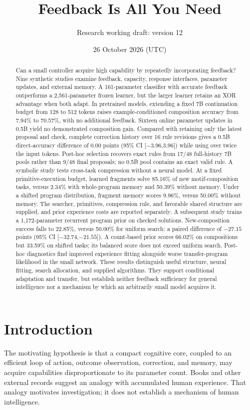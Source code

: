 \documentclass[11pt]{article}
\title{Feedback Is All You Need}
\author{Research working draft: version 12}
\date{26 October 2026 (UTC)}
\begin{document}
\maketitle
\begin{abstract}
Can a small controller acquire high capability by repeatedly incorporating
feedback? Nine synthetic studies examine feedback, capacity, response
interfaces, parameter updates, and external memory. A 161-parameter classifier
with accurate feedback outperforms a 2,561-parameter frozen learner, but the
larger learner retains an XOR advantage when both adapt. In pretrained models,
extending a fixed 7B continuation budget from 128 to 512 tokens raises
example-conditioned composition accuracy from 7.94\% to 70.57\%, with no
additional feedback. Sixteen online parameter updates in 0.5B yield no
demonstrated composition gain. Compared with retaining only the latest proposal
and check, complete correction history over 16 rule revisions gives a 0.5B
direct-accuracy difference of 0.00 points
(95\% CI [$-3.96$,3.96]) while using over twice the input tokens.
Post-hoc selection recovers exact rules from 17/48 full-history 7B pools
rather than 9/48 final proposals; no 0.5B pool contains an exact valid rule.
A symbolic study tests cross-task compression without a neural model.
At a fixed primitive-execution budget, learned fragments solve 85.16\% of
new motif-composition tasks, versus 2.34\% with whole-program memory and
50.39\% without memory. Under a shifted program distribution, fragment
memory scores 9.96\%, versus 50.00\% without memory. The searcher, primitives,
compression rule, and favorable shared structure are supplied, and prior
experience costs are reported separately. A subsequent study trains a
1,172-parameter recurrent program prior on checked solutions. New-composition
success falls to 22.85\%, versus 50.00\% for uniform search: a paired difference
of $-27.15$ points (95\% CI [$-32.74$,$-21.55$]). A count-based prior scores
66.02\% on compositions but 33.59\% on shifted tasks; its balanced score does
not exceed uniform search. Post-hoc diagnostics find improved experience
fitting alongside worse transfer-program likelihood in the small network.
These results distinguish useful structure,
neural fitting, search allocation, and supplied algorithms. They support
conditional adaptation and transfer, but
establish neither feedback sufficiency for general intelligence nor a
mechanism by which an arbitrarily small model acquires it.
\end{abstract}

\section{Introduction}
The motivating hypothesis is that a compact cognitive core, coupled to an
efficient loop of action, outcome observation, correction, and memory, may
acquire capabilities disproportionate to its parameter count. Books and other
external records suggest an analogy with accumulated human experience. That
analogy motivates investigation; it does not establish a mechanism of human
intelligence.
\end{document}
